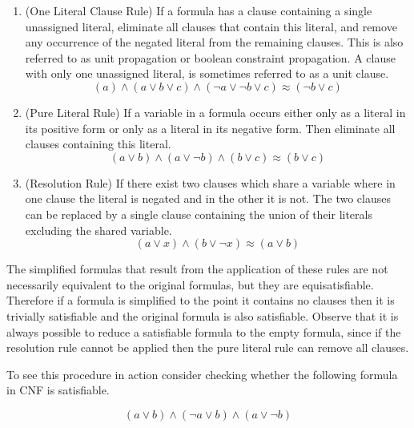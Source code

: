 \begin{enumerate}
    \item (One Literal Clause Rule) If a formula has a clause containing a single unassigned literal,
    eliminate all clauses that contain this literal, and remove any occurrence of the negated
    literal from the remaining clauses.
    This is also referred to as unit propagation or boolean constraint propagation.
    A clause with only one unassigned literal, is sometimes referred to as a unit
    clause.
    \begin{equation*}
        (a) \land (a \lor b \lor c) \land (\neg a \lor \neg b \lor c) \approx (\neg b \lor c)
    \end{equation*}
    \item (Pure Literal Rule) If a variable in a formula occurs either only 
    as a literal in its positive form or only as a literal in its negative form.
    Then eliminate all clauses containing this literal.
    \begin{equation*}
        (a \lor b) \land (a \lor \neg b) \land (b \lor c) \approx (b \lor c)
    \end{equation*}
    \item (Resolution Rule) If there exist two clauses which share a variable where in one
    clause the literal is negated and in the other it is not. The two clauses can be replaced
    by a single clause containing the union of their literals excluding the shared variable.
    \begin{equation*}
        (a \lor x)\land(b \lor \neg x) \approx (a \lor b)
    \end{equation*}
\end{enumerate}

The simplified formulas that result from the application of these rules
are not necessarily equivalent to the original formulas, but they are
equisatisfiable. Therefore if a formula is simplified to the point it contains
no clauses then it is trivially satisfiable and the original formula is also
satisfiable. Observe that it is always possible to reduce a satisfiable formula
to the empty formula, since if the resolution rule cannot be applied then
the pure literal rule can remove all clauses.

To see this procedure in action consider checking whether the following
formula in CNF is satisfiable.

\begin{equation} \label{eq:DP_example}
    (a \lor b) \land (\neg a \lor b) \land (a \lor \neg b)
\end{equation}

